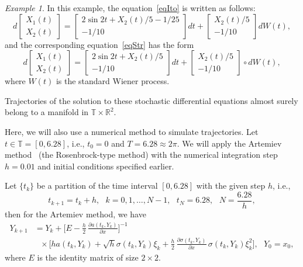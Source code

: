 \documentclass[10pt,reqno]{amsart}
\theoremstyle{plain}
\theoremstyle{remark}
\newtheorem{Example}{Example}
\begin{document}
\begin{Example}
In this example, the equation~\eqref{eqIto} is written as follows:
\[
  d \left[ \begin{array}{c} X_1(t) \\ X_2(t) \end{array} \right] =
    \left[ \begin{array}{c} 2\sin 2t + X_2(t) / 5 - 1/25 \\ {-1/10} \end{array} \right] dt +
    \left[ \begin{array}{c} X_2(t) / 5 \\ {-1/10} \end{array} \right] dW(t),
\]
and the corresponding equation~\eqref{eqStr} has the form
\[
  d \left[ \begin{array}{c} X_1(t) \\ X_2(t) \end{array} \right] =
    \left[ \begin{array}{c} 2\sin 2t + X_2(t) / 5 \\ {-1/10} \end{array} \right] dt +
    \left[ \begin{array}{c} X_2(t) / 5 \\ {-1/10} \end{array} \right] \circ dW(t),
\]
where $W(t)$ is the standard Wiener process.

Trajectories of the solution to these stochastic differential equations almost surely belong to a manifold in $\mathds{T} \times \mathds{R}^2$.

Here, we will also use a numerical method to simulate trajectories. Let $t \in \mathds{T} = [0,6.28]$, i.e., $t_0 = 0$ and $T = 6.28 \approx 2\pi$. We will apply the Artemiev method~\cite{ArtAve_97} (the Rosenbrock-type method) with the numerical integration step $h = 0.01$ and initial conditions specified earlier.

Let $\{t_k\}$ be a partition of the time interval $[0,6.28]$ with the given step $h$, i.e.,
\[
  t_{k+1} = t_k + h, \ \ \ k = 0,1,\dots,N-1, \ \ \ t_N = 6.28, \ \ \ N = \frac{6.28}{h},
\]
then for the Artemiev method, we have
\begin{align*}
  Y_{k+1} & = Y_k + \biggl[ E - \frac{h}{2} \, \frac{\partial a(t_k,Y_k)}{\partial x} \biggr]^{-1} \\
  & \ \ \ {} \times \biggr[h a(t_k,Y_k) + \sqrt{h} \sigma(t_k,Y_k) \xi_k + \frac{h}{2} \, \frac{\partial \sigma(t_k,Y_k)}{\partial x} \, \sigma(t_k,Y_k) \xi_k^2 \biggr], \ \ \ Y_0 = x_0,
\end{align*}
where $E$ is the identity matrix of size $2 \times 2$.


\end{Example}
\end{document}
